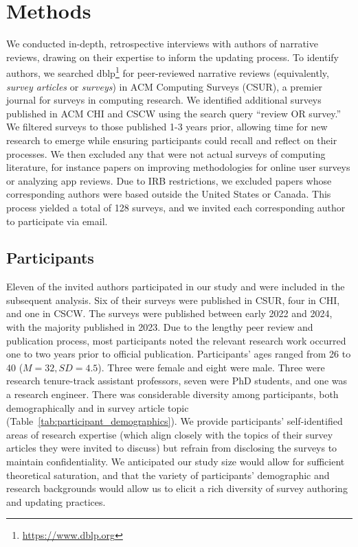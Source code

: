 \section{Methods}
We conducted in-depth, retrospective interviews with authors of narrative reviews, drawing on their expertise to inform the updating process. To identify authors, we searched dblp\footnote{\url{https://www.dblp.org}} for peer-reviewed narrative reviews (equivalently, \textit{survey articles} or \textit{surveys}) in ACM Computing Surveys (CSUR), a premier journal for surveys in computing research. We identified additional surveys published in ACM CHI and CSCW using the search query ``review OR survey.'' We filtered surveys to those published 1-3 years prior, allowing time for new research to emerge while ensuring participants could recall and reflect on their processes. We then excluded any that were not actual surveys of computing literature, for instance papers on improving methodologies for online user surveys or analyzing app reviews. Due to IRB restrictions, we excluded papers whose corresponding authors were based outside the United States or Canada. This process yielded a total of 128 surveys, and we invited each corresponding author to participate via email.


\subsection{Participants}
Eleven of the invited authors participated in our study and were included in the subsequent analysis. Six of their surveys were published in CSUR, four in CHI, and one in CSCW. The surveys were published between early 2022 and 2024, with the majority published in 2023. Due to the lengthy peer review and publication process, most participants noted the relevant research work occurred one to two years prior to official publication. Participants' ages ranged from 26 to 40 ($M = 32, SD = 4.5$). Three were female and eight were male. Three were research tenure-track assistant professors, seven were PhD students, and one was a research engineer. There was considerable diversity among participants, both demographically and in survey article topic (Table~\ref{tab:participant_demographics}). We provide participants' self-identified areas of research expertise (which align closely with the topics of their survey articles they were invited to discuss) but refrain from disclosing the surveys to maintain confidentiality. We anticipated our study size would allow for sufficient theoretical saturation, and that the variety of participants' demographic and research backgrounds would allow us to elicit a rich diversity of survey authoring and updating practices.

